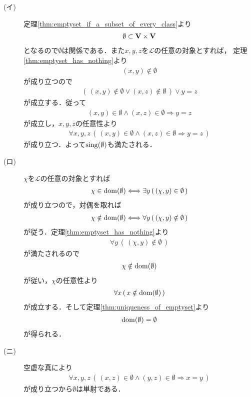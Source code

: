 	\begin{prf}\mbox{}
		\begin{description}
			\item[(イ)]
				定理\ref{thm:emptyset_if_a_subset_of_every_class}より
				\begin{align}
					\emptyset \subset \mathbf{V} \times \mathbf{V}
				\end{align}
				となるので$\emptyset$は関係である．また$x,y,z$を$\mathcal{L}$の任意の対象とすれば，
				定理\ref{thm:emptyset_has_nothing}より
				\begin{align}
					(x,y) \notin \emptyset
				\end{align}
				が成り立つので
				\begin{align}
					\left(\, (x,y) \notin \emptyset \vee (x,z) \notin \emptyset\, \right) \vee y = z
				\end{align}
				が成立する．従って
				\begin{align}
					(x,y) \in \emptyset \wedge (x,z) \in \emptyset \Longrightarrow y = z
				\end{align}
				が成立し，$x,y,z$の任意性より
				\begin{align}
					\forall x,y,z\, \left(\, (x,y) \in \emptyset \wedge (x,z) \in \emptyset
					\Longrightarrow y = z\, \right)
				\end{align}
				が成り立つ．よって$\operatorname*{sing} (\emptyset)$も満たされる．
		
			\item[(ロ)] $\chi$を$\mathcal{L}$の任意の対象とすれば
				\begin{align}
					\chi \in \operatorname*{dom} (\emptyset) \Longleftrightarrow 
					\exists y\, (\, (\chi,y) \in \emptyset\, )
				\end{align}
				が成り立つので，対偶を取れば
				\begin{align}
					\chi \notin \operatorname*{dom} (\emptyset) \Longleftrightarrow 
					\forall y\, (\, (\chi,y) \notin \emptyset\, )
				\end{align}
				が従う．定理\ref{thm:emptyset_has_nothing}より
				\begin{align}
					\forall y\, (\, (\chi,y) \notin \emptyset\, )
				\end{align}
				が満たされるので
				\begin{align}
					\chi \notin \operatorname*{dom} (\emptyset)
				\end{align}
				が従い，$\chi$の任意性より
				\begin{align}
					\forall x\, (\, x \notin \operatorname*{dom} (\emptyset)\, )
				\end{align}
				が成立する．そして定理\ref{thm:uniqueness_of_emptyset}より
				\begin{align}
					\operatorname*{dom} (\emptyset) = \emptyset
				\end{align}
				が得られる．
			
			\item[(ニ)] 空虚な真により
				\begin{align}
					\forall x,y,z\, \left(\, (x,z) \in \emptyset \wedge (y,z) \in \emptyset \Longrightarrow x = y\, \right)
				\end{align}
				が成り立つから$\emptyset$は単射である．
				\QED
		\end{description}
	\end{prf}
	
